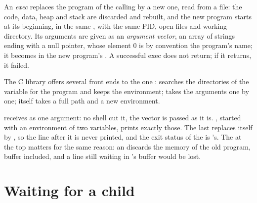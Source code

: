 \begin{definition}\label{def:b2:processes-and-system-calls:exec}
An \emph{exec} replaces the program of the calling  by a new one, read from a file: the code,
data, heap and stack are discarded and rebuilt, and the new program starts at its beginning, in the same ,
with the same PID, open files and working directory. Its arguments are given as an \emph{argument vector}, an array of strings ending with a null pointer, whose element 0 is by convention the program's name; it
becomes  in the new program's . A successful exec does not return; if it returns, it failed.
\end{definition}

The C library offers several front ends to the one  :  searches
the directories of the  variable for the program and keeps the environment;  takes the
arguments one by one;  itself takes a full path and a new environment.



 receives  as one argument: no shell cut it, the vector is passed as it is. ,
started with an environment of two variables, prints exactly those. The last  replaces  itself
by , so the line after it is never printed, and the exit status of the  is 's. The
 at the top matters for the same reason: an  discards the memory of the old program, buffer
included, and a line still waiting in 's buffer would be lost.

\section{Waiting for a child}\label{sec:b2:processes-and-system-calls:wait}

